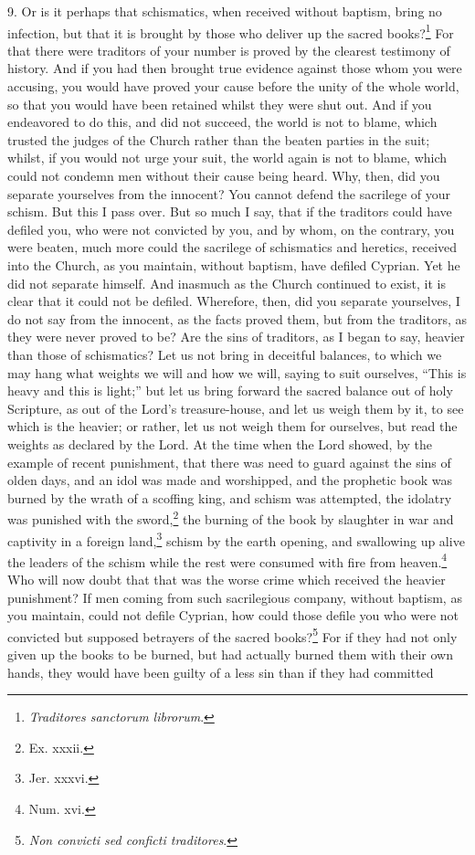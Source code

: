 9. Or is it perhaps that schismatics, when received without baptism, bring no infection, but that it is brought by those who deliver up the sacred books?\footnote{\par  \emph{Traditores sanctorum librorum}.} For that there were traditors of your number is proved by the clearest testimony of history. And if you had then brought true evidence against those whom you were accusing, you would have proved your cause before the unity of the whole world, so that you would have been retained whilst they were shut out. And if you endeavored to do this, and did not succeed, the world is not to blame, which trusted the judges of the Church rather than the beaten parties in the suit; whilst, if you would not urge your suit, the world again is not to blame, which could not condemn men without their cause being heard. Why, then, did you separate yourselves from the innocent? You cannot defend the sacrilege of your schism. But this I pass over. But so much I say, that if the traditors could have defiled you, who were not convicted by you, and by whom, on the contrary, you were beaten, much more could the sacrilege of schismatics and heretics, received into the Church, as you maintain, without baptism, have defiled Cyprian. Yet he did not separate himself. And inasmuch as the Church continued to exist, it is clear that it could not be defiled. Wherefore, then, did you separate yourselves, I do not say from the innocent, as the facts proved them, but from the traditors, as they were never proved to be? Are the sins of traditors, as I began to say, heavier than those of schismatics? Let us not bring in deceitful balances, to which we may hang what weights we will and how we will, saying to suit ourselves, ``This is heavy and this is light;'' but let us bring forward the sacred balance out of holy Scripture, as out of the Lord’s treasure-house, and let us weigh them by it, to see which is the heavier; or rather, let us not weigh them for ourselves, but read the weights as declared by the Lord. At the time when the Lord showed, by the example of recent punishment, that there was need to guard against the sins of olden days, and an idol was made and worshipped, and the prophetic book was burned by the wrath of a scoffing king, and schism was attempted, the idolatry was punished with the sword,\footnote{\par  Ex. xxxii.} the burning of the book by slaughter in war and captivity in a foreign land,\footnote{\par  Jer. xxxvi.} schism by the earth opening, and swallowing up alive the leaders of the schism while the rest were consumed with fire from heaven.\footnote{\par  Num. xvi.} Who will now doubt that that was the worse crime which received the heavier punishment? If men coming from such sacrilegious company, without baptism, as you maintain, could not defile Cyprian, how could those defile you who were not convicted but supposed betrayers of the sacred books?\footnote{\par  \emph{Non convicti sed conficti traditores}.} For if they had not only given up the books to be burned, but had actually burned them with their own hands, they would have been guilty of a less sin than if they had committed 
